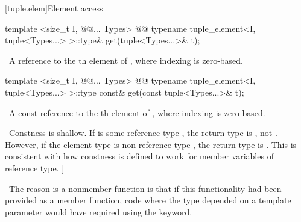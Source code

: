 \documentclass[american,twoside]{book}
\begin{document}
[tuple.elem]{Element access}

%
%
\begin{itemdecl}
template <size_t I, @@... Types> 
  @@
  typename tuple_element<I, tuple<Types...> >::type& get(tuple<Types...>& t);
\end{itemdecl}

\begin{itemdescr}
\pnum
{}

\pnum
{}

\pnum
\returns\  A reference to the th element of , where
indexing is zero-based.
\end{itemdescr}

%
%
\begin{itemdecl}
template <size_t I, @@... Types> 
  @@
  typename tuple_element<I, tuple<Types...> >::type const& get(const tuple<Types...>& t);
\end{itemdecl}

\begin{itemdescr}
\pnum
{}

\pnum
{}

\pnum
\returns\  A const reference to the th element of , where
indexing is zero-based.

\pnum
\enternote\ Constness is shallow. If  is some
reference type , the return type is , not .
However, if the element type is non-reference type , the return
type is .
This is consistent with how constness is defined to work 
for member variables of reference type. \exitnote]

\pnum
\enternote\ The reason  is a
nonmember function is that if this functionality had been
provided as a member function, code where the type
depended on a template parameter would have required using
the  keyword. \exitnote\
\end{itemdescr}
\end{document}
